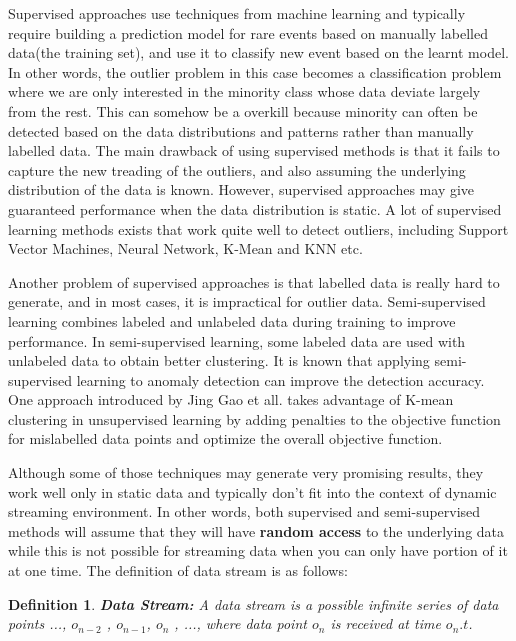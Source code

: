 \documentclass[11pt]{article}       %
\newtheorem{definition}{Definition}
\begin{document}
Supervised approaches use techniques from machine learning and typically require building a prediction model for rare events based on manually labelled data(the training set), and use it to classify new event based on the learnt model\cite{Joshi:2001:MNH:376284.375673,sup02}. In other words, the outlier problem in this case becomes a classification problem where we are only interested in the minority class whose data deviate largely from the rest. This can somehow be a overkill because minority can often be detected based on the data distributions and patterns rather than manually labelled data. The main drawback of using supervised methods is that it fails to capture the new treading of the outliers, and also assuming the underlying distribution of the data is known. However, supervised approaches may give guaranteed performance when the data distribution is static. A lot of supervised learning methods exists that work quite well to detect outliers, including Support Vector Machines, Neural Network, K-Mean and KNN etc. 

Another problem of supervised approaches is that labelled data is really hard to generate, and in most cases, it is impractical for outlier data. Semi-supervised learning\cite{Basu:2004:PFS:1014052.1014062,semi-sup02} combines labeled and unlabeled data during training to improve performance. In semi-supervised learning, some labeled data are used with unlabeled data to obtain better clustering. It is known that applying semi-supervised learning to anomaly detection can improve the detection accuracy\cite{Yu2009}. One approach introduced by Jing Gao et all.\cite{Gao:2006:SOD:1141277.1141421} takes advantage of K-mean clustering in unsupervised learning by adding penalties to the objective function for mislabelled data points and optimize the overall objective function. 

Although some of those techniques may generate very promising results, they work well only in static data and typically don't fit into the context of dynamic streaming environment. In other words, both supervised and semi-supervised methods will assume that they will have \textbf{random access} to the underlying data while this is not possible for streaming data when you can only have portion of it at one time. The definition of data stream is as follows:

\begin{definition}
\textbf{Data Stream:} A data stream is a possible infinite series of data points ..., $o_{n-2}$ , $o_{n-1}$, $o_{n}$ , ..., where data point $o_{n}$ is received at time $o_{n}.t$.
\end{definition}
\end{document}
